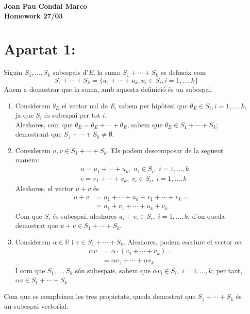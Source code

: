 \documentclass[a4paper, 12pt]{article}
\begin{document}
    \begin{center}
        \Large
        \textbf{Joan Pau Condal Marco\\Homework 27/03\\}
        \normalsize
    \end{center}

    \section*{Apartat 1:}
    Siguin $S_1,\dots,S_k$ subespais d'\emph{E}, la suma $S_1+\cdots+S_k$ es defineix com
    \begin{equation*}
        S_1 + \cdots + S_k = \{ u_1+\cdots+u_k, u_i\in S_i, i=1,\dots,k \}
    \end{equation*}
    Anem a demostrar que la suma, amb aquesta definici\'o  \'es un subespai.
    \begin{enumerate}
        \item Considerem $\theta_E$ el vector nul de \emph{E}, sabem per hip\`otesi que $\theta_E \in S_i, i=1,\dots,k$, ja que $S_i$ \'es subespai per tot $i$.\\
              Aleshores, com que $\theta_E = \theta_E + \cdots + \theta_E$, sabem que $\theta_E \in S_1+\cdots+S_k$; demostrant que $S_1+\cdots+S_k \neq \emptyset$.
        \item Considerem $u,v \in S_1+\cdots+S_k$. Els podem descomposar de la seg\"uent manera:
              \begin{align*}
                  &u = u_1 + \cdots + u_k, \; u_i \in S_i, \; i = 1,\dots,k\\
                  &v = v_1 + \cdots + v_k, \; v_i \in S_i, \; i = 1,\dots,k
              \end{align*}
              Aleshores, el vector $u+v$ \'es 
              \begin{align*}
                  u+v &= u_1 + \cdots + u_k + v_1 + \cdots + v_k =\\
                      &= u_1 + v_1 + \cdots + u_k + v_k
              \end{align*}
              Com que $S_i$ \'es subespai, aleshores $u_i + v_i \in S_i,\;i=1,\dots,k$, d'on queda demostrat que $u+v \in S_1+\cdots+S_k$.
        \item Considerem $\alpha \in \mathbb{R}$ i $v \in S_1+\cdots+S_k$. Aleshores, podem escriure el vector $\alpha v$
              \begin{align*}
                  \alpha v &= \alpha\cdot(v_1+\cdots+v_k) = \\
                           &= \alpha v_1 + \cdots + \alpha v_k
              \end{align*}
              I com que $S_1,\dots,S_k$ s\'on subespais, sabem que $\alpha v_i \in S_i,\;i=1,\dots,k$; per tant, $\alpha v \in S_1+\cdots+S_k$.
    \end{enumerate}
    Com que es compleixen les tres propietats, queda demostrat que $S_1+\cdots+S_k$ \'es un subespai vectorial.
\end{document}
